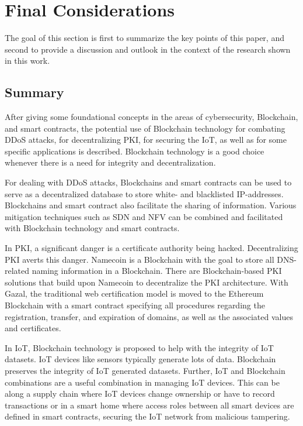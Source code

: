 \section{Final Considerations}

The goal of this section is first to summarize the key points of this paper, and second to provide a discussion and outlook in the context of the research shown in this work.

\subsection{Summary}

After giving some foundational concepts in the areas of cybersecurity, Blockchain, and smart contracts, the potential use of Blockchain technology for combating DDoS attacks, for decentralizing PKI, for securing the IoT, as well as for some specific applications is described. Blockchain technology is a good choice whenever there is a need for integrity and decentralization.

For dealing with DDoS attacks, Blockchains and smart contracts can be used to serve as a decentralized database to store white- and blacklisted IP-addresses. Blockchains and smart contract also facilitate the sharing of information.
Various mitigation techniques such as SDN and NFV can be combined and facilitated with Blockchain technology and smart contracts.

In PKI, a significant danger is a certificate authority being hacked. Decentralizing PKI averts this danger. Namecoin is a Blockchain with the goal to store all DNS-related naming information in a Blockchain. There are Blockchain-based PKI solutions that build upon Namecoin to decentralize the PKI architecture.
With Gazal, the traditional web certification model is moved to the Ethereum Blockchain with a smart contract specifying all procedures regarding the registration, transfer, and expiration of domains, as well as the associated values and certificates.

In IoT, Blockchain technology is proposed to help with the integrity of IoT datasets. IoT devices like sensors typically generate lots of data. Blockchain preserves the integrity of IoT generated datasets. Further, IoT and Blockchain combinations are a useful
combination in managing IoT devices. This can be along a supply chain where IoT devices change ownership or have to record transactions or in a smart home
where access roles between all smart devices are defined in smart contracts, securing the IoT network from malicious tampering.


